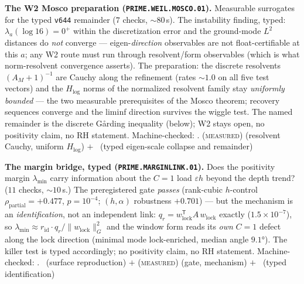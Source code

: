 \par\smallskip\noindent\textbf{The W2 Mosco preparation
(\texttt{PRIME.WEIL.MOSCO.01}).}
Measurable surrogates for the typed \texttt{v644} remainder ($7$
checks, ${\sim}80$\,s).  The instability finding, typed:
$\lambda_a(\log 16)=0^+$ within the discretization error and the
ground-mode $L^2$ distances do \emph{not} converge ---
eigen-\emph{direction} observables are not float-certifiable at this
$a$; any W2 route must run through resolvent/form observables (which
is what norm-resolvent convergence asserts).  The preparation: the
discrete resolvents $(A_M+1)^{-1}$ are Cauchy along the refinement
(rates ${\sim}1.0$ on all five test vectors) and the $H_{\log}$
norms of the normalized resolvent family stay \emph{uniformly
bounded} --- the two measurable prerequisites of the Mosco theorem;
recovery sequences converge and the liminf direction survives the
wiggle test.  The named remainder is the discrete G\aa rding
inequality (below); W2 stays open, no positivity claim, no RH
statement.
Machine-checked: .
(\textsc{measured}) (resolvent Cauchy, uniform $H_{\log}$) $+$ \mC\
(typed eigen-scale collapse and remainder)
\par\smallskip


\par\smallskip\noindent\textbf{The margin bridge, typed
(\texttt{PRIME.MARGINLINK.01}).}
Does the positivity margin $\lambda_{\min}$ carry information about
the $C=1$ load $\varepsilon h$ beyond the depth trend? ($11$ checks,
${\sim}10$\,s.)  The preregistered gate \emph{passes} (rank-cubic
$h$-control $\rho_{\mathrm{partial}}=+0.477$, $p=10^{-4}$;
$(h,\alpha)$ robustness $+0.701$) --- but the mechanism is an
\emph{identification}, not an independent link:
$q_r=w_{\mathrm{lock}}^{\mathsf T}\widehat A\,w_{\mathrm{lock}}$
exactly ($1.5\times10^{-7}$), so
$\lambda_{\min}\approx r_{\mathrm{id}}\cdot
q_r/\|w_{\mathrm{lock}}\|^2_G$ and the window form reads its
\emph{own} $C=1$ defect along the lock direction (minimal mode
lock-enriched, median angle $9.1°$).  The killer test is typed
accordingly; no positivity claim, no RH statement.
Machine-checked: .
\mE\ (surface reproduction) $+$ (\textsc{measured}) (gate,
mechanism) $+$ \mC\ (typed identification)
\par\smallskip


